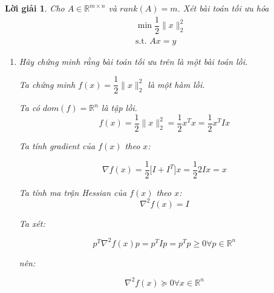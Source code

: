 \documentclass[14pt, a4paper]{article}
\theoremstyle{sltheorem}
\theoremstyle{soltheorem}
\newtheorem*{loigiai}{Lời giải}
\begin{document}
    \begin{loigiai}

        Cho $A \in \mathbb{R}^{m\times n}$ và $rank(A)=m$. Xét bài toán tối ưu hóa
        \begin{equation*}
            \begin{aligned}
                &\min \dfrac{1}{2} \lVert x \rVert_2^2 \\ &\text{s.t. }Ax=y
            \end{aligned}
        \end{equation*}
        
        \begin{enumerate} [wide, labelwidth=!, labelindent=0pt,label=\textbf{\arabic*}.]
            \item Hãy chứng minh rằng bài toán tối ưu trên là một bài toán lồi.
            
            Ta chứng minh $f(x)=\dfrac{1}{2} \lVert x \rVert_2^2$ là một hàm lồi.
            
            Ta có $dom(f)=\mathbb{R}^n$ là tập lồi.
            \begin{equation*}
                f(x)=\dfrac{1}{2} \lVert x \rVert_2^2=\dfrac{1}{2}x^T x=\dfrac{1}{2}x^T I x
            \end{equation*}

            Ta tính gradient của $f(x)$ theo $x$:

            \begin{equation*}
                \nabla f(x)=\dfrac{1}{2} \Big\lbrack I + I^T \Big\rbrack x=\dfrac{1}{2}2Ix=x
            \end{equation*}

            Ta tính ma trận Hessian của $f(x)$ theo $x$:
            \begin{equation*}
                \nabla^2 f(x)=I
            \end{equation*}

            Ta xét:

            \begin{equation*}
                p^T \nabla^2 f(x) p=p^T I p = p^T p \geq 0 \forall p \in \mathbb{R}^n
            \end{equation*}

            nên:

            \begin{equation*}
                \nabla^2 f(x) \succeq 0 \forall x \in \mathbb{R}^n
            \end{equation*}


\end{enumerate}
\end{loigiai}
\end{document}
